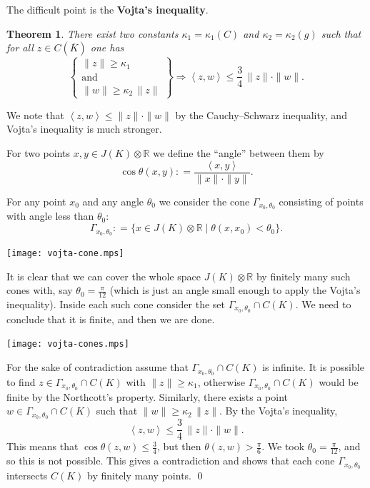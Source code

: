 \documentclass{article}
\newtheorem{theorem}[proposition]{Theorem}
\theoremstyle{definition}
\newcommand{\term}{\textbf}
\newcommand{\dfn}{\mathrel{\mathop:}=}
\newcommand{\RR}{\mathbb{R}}
\begin{document}
The difficult point is the \term{Vojta's inequality}.

\begin{theorem}
  There exist two constants $\kappa_1 = \kappa_1 (C)$ and
  $\kappa_2 = \kappa_2 (g)$ such that for all $z \in C (\overline{K})$ one has
  $$\left\{\begin{array}{c}
             \|z\| \ge \kappa_1\\
             \text{and}\\
             \|w\| \ge \kappa_2\,\|z\|
           \end{array}\right\} \Rightarrow \left<z,w\right> \le \frac{3}{4}\,\|z\| \cdot \|w\|.$$
\end{theorem}

We note that $\left<z,w\right> \le \|z\| \cdot \|w\|$ by the Cauchy--Schwarz
inequality, and Vojta's inequality is much stronger.

For two points $x,y \in J (K) \otimes \RR$ we define the ``angle'' between them
by
$$\cos \theta (x,y) \dfn \frac{\left<x,y\right>}{\|x\|\cdot \|y\|}.$$

For any point $x_0$ and any angle $\theta_0$ we consider the cone
$\Gamma_{x_0,\theta_0}$ consisting of points with angle less than $\theta_0$:
$$\Gamma_{x_0,\theta_0} \dfn \{ x\in J(K)\otimes \RR \mid \theta (x,x_0) < \theta_0 \}.$$

\begin{center}
  \texttt{[image: vojta-cone.mps]}
\end{center}

It is clear that we can cover the whole space $J(K)\otimes \RR$ by finitely many
such cones with, say $\theta_0 = \frac{\pi}{12}$ (which is just an angle small
enough to apply the Vojta's inequality). Inside each such cone consider the set
$\Gamma_{x_0, \theta_0} \cap C (K)$. We need to conclude that it is finite,
and then we are done.

\begin{center}
  \texttt{[image: vojta-cones.mps]}
\end{center}

For the sake of contradiction assume that $\Gamma_{x_0, \theta_0} \cap C (K)$ is
infinite. It is possible to find $z \in \Gamma_{x_0, \theta_0} \cap C (K)$ with
$\|z\| \ge \kappa_1$, otherwise $\Gamma_{x_0, \theta_0} \cap C (K)$ would be
finite by the Northcott's property. Similarly, there exists a point
$w \in \Gamma_{x_0, \theta_0} \cap C (K)$ such that
$\|w\| \ge \kappa_2 \, \|z\|$. By the Vojta's inequality,
$$\left<z,w\right> \le \frac{3}{4}\, \|z\|\cdot \|w\|.$$
This means that $\cos \theta (z,w) \le \frac{3}{4}$, but then
$\theta (z,w) > \frac{\pi}{6}$. We took $\theta_0 = \frac{\pi}{12}$, and so this
is not possible. This gives a contradiction and shows that each cone
$\Gamma_{x_0, \theta_0}$ intersects $C (K)$ by finitely many points. \qed
\end{document}
